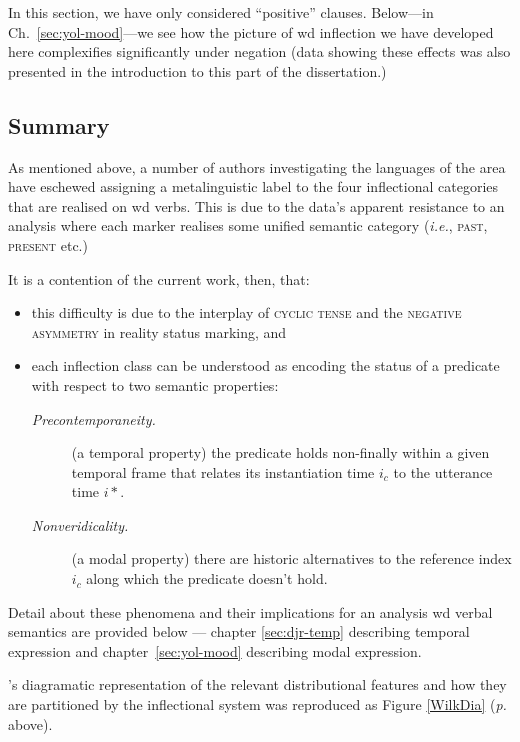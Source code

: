 In this section, we have only considered ``positive'' clauses. Below---in Ch.~\ref{sec:yol-mood}---we see how the picture of \acrshort{wd} inflection we have developed here complexifies significantly under negation (data showing these effects was also presented in the introduction to this part of the dissertation.)


\subsection{Summary}

As mentioned above, a number of authors investigating the languages of the area have eschewed assigning a metalinguistic label to the four inflectional categories that are realised on \acrlong{wd} verbs. This is due to the data's apparent resistance to an analysis where each marker realises some unified semantic category (\textit{i.e.}, \textsc{past, present} etc.) 

It is a contention of the current work, then, that: \begin{itemize}\item  this difficulty is due to the interplay of \textsc{cyclic tense} and the \textsc{negative asymmetry} in reality status marking, and \item  each inflection class can be understood as encoding the status of a predicate with respect to two semantic properties:
	\begin{description}%
		\item[\textit{Precontemporaneity.}]  (a temporal property) the predicate holds non-finally within a given temporal frame that relates its instantiation time $ i_c $ to the utterance time $ i* $.
		\item[\textit{Nonveridicality.}] (a modal property) there are historic alternatives to the reference index $ i_c $ along which the predicate doesn't hold.
	\end{description}
	
\end{itemize} Detail about these phenomena and their implications for an analysis \acrshort{wd} verbal semantics are provided below --- chapter \ref{sec:djr-temp} describing temporal expression and chapter~\ref{sec:yol-mood} describing modal expression. 

\citeauthor{Wilkinson1991}'s diagramatic representation \citeyearpar[326]{Wilkinson1991} of the relevant distributional features and how they are partitioned by the inflectional system was reproduced as Figure \ref{WilkDia} (\textit{p. \pageref{WilkDia}} above). 

